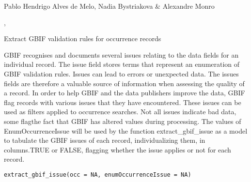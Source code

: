 \documentclass[a4paper]{book}
\begin{document}
%
\begin{Author}
Pablo Hendrigo Alves de Melo,
Nadia Bystriakova \&
Alexandre Monro
\end{Author}
%
\begin{SeeAlso}
, 
\end{SeeAlso}
%
\begin{Examples}
\end{Examples}
%
\begin{Description}
Extract GBIF validation rules for occurrence records

GBIF recognises and documents several issues relating to the data fields for an individual record.
The issue field stores terms that represent an enumeration of GBIF validation rules.
Issues can lead to errors or unexpected data. The issues fields are therefore a valuable source of information
when assessing the quality of a record. In order to help GBIF and the data publishers improve the data,
GBIF flag records with various issues that they have encountered. These issues can be  used as filters applied
to occurrence searches. Not all issues indicate bad data, some flagthe fact that GBIF has altered values during
processing. The values of EnumOccurrenceIssue will be used by the function extract\_gbif\_issue as a model to tabulate
the GBIF issues of each record, individualizing them, in columns.TRUE or FALSE, flagging whether the issue applies or
not for each record.
\end{Description}
%
\begin{Usage}
\begin{verbatim}
extract_gbif_issue(occ = NA, enumOccurrenceIssue = NA)
\end{verbatim}
\end{Usage}
\end{document}
